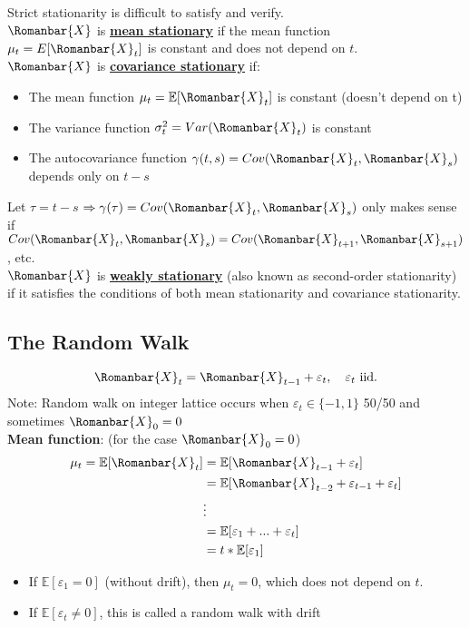 Strict stationarity is difficult to satisfy and verify. \\

$\Romanbar{X}$ is \textbf{\underline{mean stationary}} if the mean function $\mu_t = E[\Romanbar{X}_t]$ is constant and does not depend on $t$.\\


$\Romanbar{X}$ is \textbf{\underline{covariance stationary}} if:
\begin{itemize}
    \item The mean function $\mu_t=\mathbb{E}[\Romanbar{X}_t]$ is constant (doesn't depend on t)
    \item The variance function $\sigma^2_t=Var(\Romanbar{X}_t)$ is constant
    \item The autocovariance function $\gamma(t,s)=Cov(\Romanbar{X}_t,\Romanbar{X}_s)$ depends only on $t-s$
\end{itemize}

Let $\tau=t-s$ $\Rightarrow \gamma(\tau) = Cov(\Romanbar{X}_t, \Romanbar{X}_s)$ only makes sense if $Cov(\Romanbar{X}_t,\Romanbar{X}_s)=Cov(\Romanbar{X}_{t+1},\Romanbar{X}_{s+1})$, etc.\\

$\Romanbar{X}$ is \textbf{\underline{weakly stationary}} (also known as second-order stationarity) if it satisfies the conditions of both mean stationarity and covariance stationarity.

\subsection{The Random Walk}

\[\Romanbar{X}_t=\Romanbar{X}_{t-1}+\varepsilon_t, \quad  \varepsilon_t \text{ iid.}\]
Note: Random walk on integer lattice occurs when $\varepsilon_t \in \{-1,1\}$ 50/50 and sometimes $\Romanbar{X}_0=0$  \\

\textbf{Mean function}: (for the case $\Romanbar{X}_0=0$)
\begin{align*}
    \mu_t=\mathbb{E}[\Romanbar{X}_t] &= \mathbb{E}[\Romanbar{X}_{t-1} + \varepsilon_t]\\
    &=\mathbb{E}[\Romanbar{X}_{t-2}+\varepsilon_{t-1}+\varepsilon_t] \\
    & \vdots\\
    &=\mathbb{E}[\varepsilon_1+...+\varepsilon_t] \\
    &=t * \mathbb{E}[\varepsilon_1]
\end{align*}
\begin{itemize}
    \item If $\mathbb{E}[\varepsilon_1=0]$ (without drift), then $\mu_t=0$, which does not depend on $t$.
    \item If $\mathbb{E}[\varepsilon_t\neq 0]$, this is called a random walk with drift
\end{itemize}

